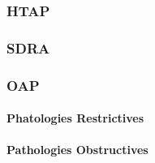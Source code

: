 \documentclass[12pt,]{article}
\let\oldparagraph\paragraph
\renewcommand{\paragraph}[1]{\oldparagraph{#1}\mbox{}}
\begin{document}
\hypertarget{htap}{%
\subsubsection{HTAP}\label{htap}}

\hypertarget{sdra}{%
\subsubsection{SDRA}\label{sdra}}

\hypertarget{oap}{%
\subsubsection{OAP}\label{oap}}

\hypertarget{phatologies-restrictives}{%
\paragraph{Phatologies Restrictives}\label{phatologies-restrictives}}

\hypertarget{pathologies-obstructives}{%
\paragraph{Pathologies Obstructives}\label{pathologies-obstructives}}
\end{document}

